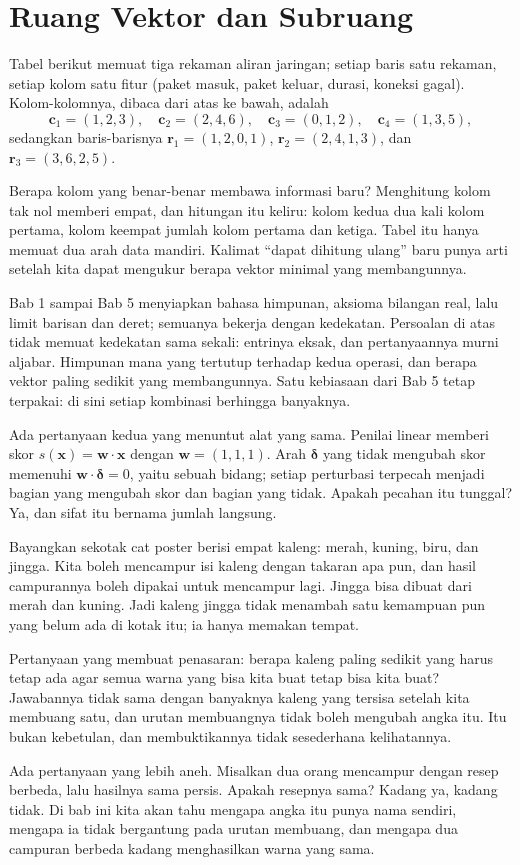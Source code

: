 \chapter{Ruang Vektor dan Subruang}

Tabel berikut memuat tiga rekaman aliran jaringan; setiap baris satu rekaman, setiap kolom satu
fitur (paket masuk, paket keluar, durasi, koneksi gagal). Kolom-kolomnya, dibaca dari atas ke
bawah, adalah
\[
  \mathbf{c}_{1}=(1,2,3),\quad \mathbf{c}_{2}=(2,4,6),\quad
  \mathbf{c}_{3}=(0,1,2),\quad \mathbf{c}_{4}=(1,3,5),
\]
sedangkan baris-barisnya $\mathbf{r}_{1}=(1,2,0,1)$, $\mathbf{r}_{2}=(2,4,1,3)$, dan
$\mathbf{r}_{3}=(3,6,2,5)$.

Berapa kolom yang benar-benar membawa informasi baru? Menghitung kolom tak nol memberi empat,
dan hitungan itu keliru: kolom kedua dua kali kolom pertama, kolom keempat jumlah kolom
pertama dan ketiga. Tabel itu hanya memuat dua arah data mandiri. Kalimat ``dapat dihitung
ulang'' baru punya arti setelah kita dapat mengukur berapa vektor minimal yang membangunnya.

Bab 1 sampai Bab 5 menyiapkan bahasa himpunan, aksioma bilangan real, lalu limit barisan dan
deret; semuanya bekerja dengan kedekatan. Persoalan di atas tidak memuat kedekatan sama sekali:
entrinya eksak, dan pertanyaannya murni aljabar. Himpunan mana yang tertutup terhadap kedua
operasi, dan berapa vektor paling sedikit yang membangunnya. Satu kebiasaan dari Bab 5 tetap
terpakai: di sini setiap kombinasi berhingga banyaknya.

Ada pertanyaan kedua yang menuntut alat yang sama. Penilai linear memberi skor
$s(\mathbf{x})=\mathbf{w}\cdot\mathbf{x}$ dengan $\mathbf{w}=(1,1,1)$. Arah
$\boldsymbol{\delta}$ yang tidak mengubah skor memenuhi
$\mathbf{w}\cdot\boldsymbol{\delta}=0$, yaitu sebuah bidang; setiap perturbasi terpecah
menjadi bagian yang mengubah skor dan bagian yang tidak. Apakah pecahan itu tunggal? Ya, dan
sifat itu bernama jumlah langsung.

\begin{untukanak}
Bayangkan sekotak cat poster berisi empat kaleng: merah, kuning, biru, dan jingga. Kita
boleh mencampur isi kaleng dengan takaran apa pun, dan hasil campurannya boleh dipakai
untuk mencampur lagi. Jingga bisa dibuat dari merah dan kuning. Jadi kaleng jingga tidak
menambah satu kemampuan pun yang belum ada di kotak itu; ia hanya memakan tempat.

Pertanyaan yang membuat penasaran: berapa kaleng paling sedikit yang harus tetap ada agar
semua warna yang bisa kita buat tetap bisa kita buat? Jawabannya tidak sama dengan banyaknya
kaleng yang tersisa setelah kita membuang satu, dan urutan membuangnya tidak boleh mengubah
angka itu. Itu bukan kebetulan, dan membuktikannya tidak sesederhana kelihatannya.

Ada pertanyaan yang lebih aneh. Misalkan dua orang mencampur dengan resep berbeda, lalu
hasilnya sama persis. Apakah resepnya sama? Kadang ya, kadang tidak. Di bab ini kita akan tahu
mengapa angka itu punya nama sendiri, mengapa ia tidak bergantung pada urutan membuang, dan
mengapa dua campuran berbeda kadang menghasilkan warna yang sama.
\end{untukanak}

